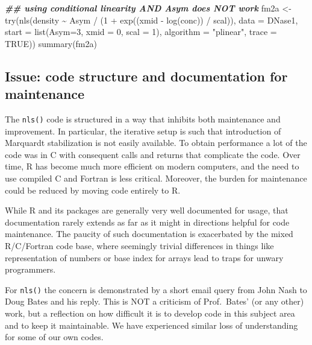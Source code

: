\documentclass[
]{article}
\newenvironment{Shaded}{\begin{snugshade}}{\end{snugshade}}
\newcommand{\AttributeTok}[1]{\textcolor[rgb]{0.77,0.63,0.00}{#1}}
\newcommand{\ConstantTok}[1]{\textcolor[rgb]{0.00,0.00,0.00}{#1}}
\newcommand{\DecValTok}[1]{\textcolor[rgb]{0.00,0.00,0.81}{#1}}
\newcommand{\DocumentationTok}[1]{\textcolor[rgb]{0.56,0.35,0.01}{\textbf{\textit{#1}}}}
\newcommand{\FunctionTok}[1]{\textcolor[rgb]{0.00,0.00,0.00}{#1}}
\newcommand{\NormalTok}[1]{#1}
\newcommand{\OtherTok}[1]{\textcolor[rgb]{0.56,0.35,0.01}{#1}}
\newcommand{\SpecialCharTok}[1]{\textcolor[rgb]{0.00,0.00,0.00}{#1}}
\newcommand{\StringTok}[1]{\textcolor[rgb]{0.31,0.60,0.02}{#1}}
\begin{document}
\begin{Shaded}
\begin{Highlighting}[]
\DocumentationTok{\#\# using conditional linearity AND Asym does NOT work}
\NormalTok{fm2a }\OtherTok{\textless{}{-}} \FunctionTok{try}\NormalTok{(}\FunctionTok{nls}\NormalTok{(density }\SpecialCharTok{\textasciitilde{}}\NormalTok{ Asym }\SpecialCharTok{/}\NormalTok{ (}\DecValTok{1} \SpecialCharTok{+} \FunctionTok{exp}\NormalTok{((xmid }\SpecialCharTok{{-}} \FunctionTok{log}\NormalTok{(conc)) }\SpecialCharTok{/}\NormalTok{ scal)), }
                 \AttributeTok{data =}\NormalTok{ DNase1, }\AttributeTok{start =} \FunctionTok{list}\NormalTok{(}\AttributeTok{Asym=}\DecValTok{3}\NormalTok{, }\AttributeTok{xmid =} \DecValTok{0}\NormalTok{, }\AttributeTok{scal =} \DecValTok{1}\NormalTok{),}
                 \AttributeTok{algorithm =} \StringTok{"plinear"}\NormalTok{, }\AttributeTok{trace =} \ConstantTok{TRUE}\NormalTok{))}
\FunctionTok{summary}\NormalTok{(fm2a)}
\end{Highlighting}
\end{Shaded}

\hypertarget{issue-code-structure-and-documentation-for-maintenance}{%
\subsection{Issue: code structure and documentation for
maintenance}\label{issue-code-structure-and-documentation-for-maintenance}}

The \texttt{nls()} code is structured in a way that inhibits both
maintenance and improvement. In particular, the iterative setup is such
that introduction of Marquardt stabilization is not easily available. To
obtain performance a lot of the code was in C with consequent calls and
returns that complicate the code. Over time, R has become much more
efficient on modern computers, and the need to use compiled C and
Fortran is less critical. Moreover, the burden for maintenance could be
reduced by moving code entirely to R.

While R and its packages are generally very well documented for usage,
that documentation rarely extends as far as it might in directions
helpful for code maintenance. The paucity of such documentation is
exacerbated by the mixed R/C/Fortran code base, where seemingly trivial
differences in things like representation of numbers or base index for
arrays lead to traps for unwary programmers.

For \texttt{nls()} the concern is demonstrated by a short email query
from John Nash to Doug Bates and his reply. This is NOT a criticism of
Prof.~Bates' (or any other) work, but a reflection on how difficult it
is to develop code in this subject area and to keep it maintainable. We
have experienced similar loss of understanding for some of our own
codes.
\end{document}
